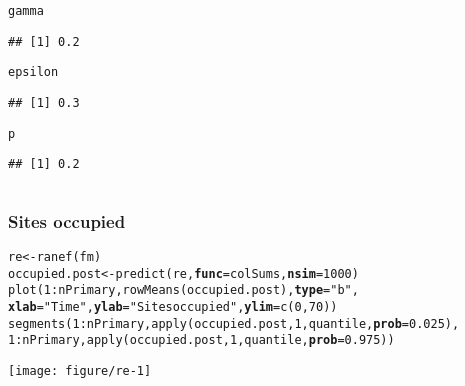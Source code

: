 \documentclass[color=usenames,dvipsnames]{beamer}\usepackage[]{graphicx}\usepackage[]{color}
\makeatletter
\newcommand{\hlnum}[1]{\textcolor[rgb]{0.69,0.494,0}{#1}}%
\newcommand{\hlstr}[1]{\textcolor[rgb]{0.749,0.012,0.012}{#1}}%
\newcommand{\hlopt}[1]{\textcolor[rgb]{0,0,0}{#1}}%
\newcommand{\hlstd}[1]{\textcolor[rgb]{0,0,0}{#1}}%
\newcommand{\hlkwb}[1]{\textcolor[rgb]{0,0.341,0.682}{#1}}%
\newcommand{\hlkwc}[1]{\textcolor[rgb]{0,0,0}{\textbf{#1}}}%
\newcommand{\hlkwd}[1]{\textcolor[rgb]{0.004,0.004,0.506}{#1}}%
\newenvironment{kframe}{%
 \def\at@end@of@kframe{}%
 \ifinner\ifhmode%
  \def\at@end@of@kframe{\end{minipage}}%
  \begin{minipage}{\columnwidth}%
 \fi\fi%
 \def\FrameCommand##1{\hskip\@totalleftmargin \hskip-\fboxsep
 \colorbox{shadecolor}{##1}\hskip-\fboxsep
     \hskip-\linewidth \hskip-\@totalleftmargin \hskip\columnwidth}%
 \MakeFramed {\advance\hsize-\width
   \@totalleftmargin\z@ \linewidth\hsize
   \@setminipage}}%
 {\par\unskip\endMakeFramed%
 \at@end@of@kframe}
\newenvironment{knitrout}{}{} %
\makeatother
\begin{document}
\begin{frame}[fragile]
\begin{columns}
\begin{column}{0.5\textwidth}
\begin{knitrout}
\begin{kframe}
\begin{alltt}
\hlstd{gamma}
\end{alltt}
\begin{verbatim}
## [1] 0.2
\end{verbatim}
\begin{alltt}
\hlstd{epsilon}
\end{alltt}
\begin{verbatim}
## [1] 0.3
\end{verbatim}
\begin{alltt}
\hlstd{p}
\end{alltt}
\begin{verbatim}
## [1] 0.2
\end{verbatim}
\end{kframe}
\end{knitrout}
    \end{column}
    \end{columns}
\end{frame}




\begin{frame}[fragile]
  \frametitle{Sites occupied}
\begin{knitrout}\scriptsize
{}\color{fgcolor}\begin{kframe}
\begin{alltt}
\hlstd{re} \hlkwb{<-} \hlkwd{ranef}\hlstd{(fm)}
\hlstd{occupied.post} \hlkwb{<-} \hlkwd{predict}\hlstd{(re,} \hlkwc{func}\hlstd{=colSums,} \hlkwc{nsim}\hlstd{=}\hlnum{1000}\hlstd{)}
\hlkwd{plot}\hlstd{(}\hlnum{1}\hlopt{:}\hlstd{nPrimary,} \hlkwd{rowMeans}\hlstd{(occupied.post),} \hlkwc{type}\hlstd{=}\hlstr{"b"}\hlstd{,}
     \hlkwc{xlab}\hlstd{=}\hlstr{"Time"}\hlstd{,} \hlkwc{ylab}\hlstd{=}\hlstr{"Sites occupied"}\hlstd{,} \hlkwc{ylim}\hlstd{=}\hlkwd{c}\hlstd{(}\hlnum{0}\hlstd{,} \hlnum{70}\hlstd{))}
\hlkwd{segments}\hlstd{(}\hlnum{1}\hlopt{:}\hlstd{nPrimary,} \hlkwd{apply}\hlstd{(occupied.post,} \hlnum{1}\hlstd{, quantile,} \hlkwc{prob}\hlstd{=}\hlnum{0.025}\hlstd{),}
         \hlnum{1}\hlopt{:}\hlstd{nPrimary,} \hlkwd{apply}\hlstd{(occupied.post,} \hlnum{1}\hlstd{, quantile,} \hlkwc{prob}\hlstd{=}\hlnum{0.975}\hlstd{))}
\end{alltt}
\end{kframe}

{\centering \texttt{[image: figure/re-1]} 

}



\end{knitrout}
\end{frame}
\end{document}
